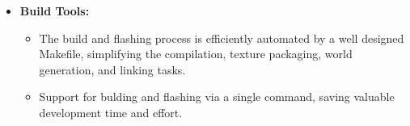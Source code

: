 \documentclass[10pt]{article}
\begin{document}
\begin{multicols}{2}
\begin{itemize}
\item \textbf{Build Tools:}
\begin{itemize}
\item The build and flashing process is efficiently automated by a well designed
Makefile, simplifying the compilation, texture packaging, world generation, and
linking tasks.
\item Support for bulding and flashing via a single command, saving valuable
development time and effort.
\end{itemize}

\end{itemize}


   

 



\end{multicols}


    
    
    
    
\end{document}

